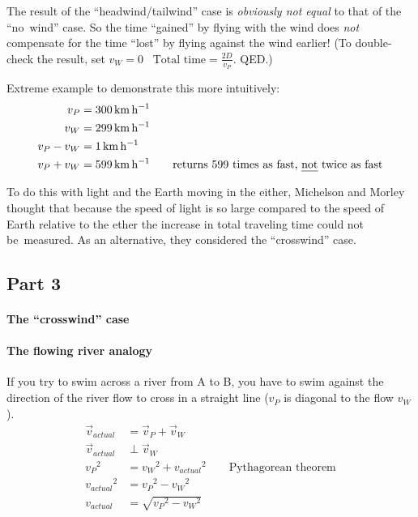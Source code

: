 \documentclass[pagesize,headsepline,10pt,parskip=half]{scrreprt}
\begin{document}
          The result of the “headwind/tailwind” case is \emph{obviously not equal}
          to that of the “no~wind” case.  So the time ``gained'' by flying with
          the wind does \emph{not} compensate for the time ``lost'' by flying
          against the wind earlier!  (To double-check the result, set $v_W = 0$
          \rightarrow~$\text{Total time} = \frac{2D}{v_P}$. QED.)

          \begin{samepage}
            Extreme example to demonstrate this more intuitively:
            \begin{align*}
              v_P &= \SI{300}{\kilo\meter\per\hour}\\
              v_W &= \SI{299}{\kilo\meter\per\hour}\\
              v_P - v_W &= \SI{1}{\kilo\meter\per\hour}\\
              v_P + v_W &= \SI{599}{\kilo\meter\per\hour} \qquad \text{returns 599 times as fast, \emph{not} twice as fast}
            \end{align*}
          \end{samepage}

          To do this with light and the Earth moving in the either, Michelson and Morley
          thought that because the speed of light is so large compared to the speed
          of Earth relative to the ether the increase in total traveling time could not
          be~measured.  As an alternative, they considered the “crosswind” case.

      \subsection{Part 3}
        \paragraph{The “crosswind” case}
        \paragraph{The flowing river analogy}
          If you try to swim across a river from A to B, you have to swim against
          the direction of the river flow to cross in a straight line ($v_P$ is
          diagonal to the flow $v_W$).
          \begin{align*}
            \vec{v}_{actual} &= \vec{v}_P + \vec{v}_W\\
            \vec{v}_{actual} &\perp \vec{v}_W\\
            {v_P}^2 &= {v_W}^2 + {v_{actual}}^2 \qquad \text{Pythagorean theorem}\\
            {v_{actual}}^2 &= {v_P}^2 - {v_W}^2\\
            v_{actual} &= \sqrt{{v_P}^2 - {v_W}^2}
          \end{align*}
\end{document}

